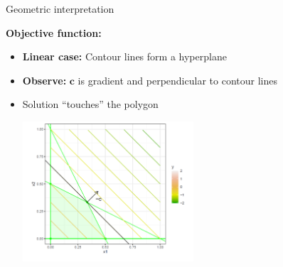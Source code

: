 \documentclass[11pt,compress,t,notes=noshow, xcolor=table]{beamer}
\begin{document}
\begin{vbframe}{Geometric interpretation}
\framebreak

\textbf{Objective function:}
\begin{itemize}
    \item \textbf{Linear case:} Contour lines form a hyperplane
    \item \textbf{Observe:} $\mathbf{c}$ is gradient and perpendicular to contour lines






\item Solution \enquote{touches} the polygon

\medskip

\begin{center}
    \includegraphics[width=0.5\textwidth]{figure_man/opposite-direction.png}
\end{center}


\end{itemize}
\end{vbframe}
\end{document}
